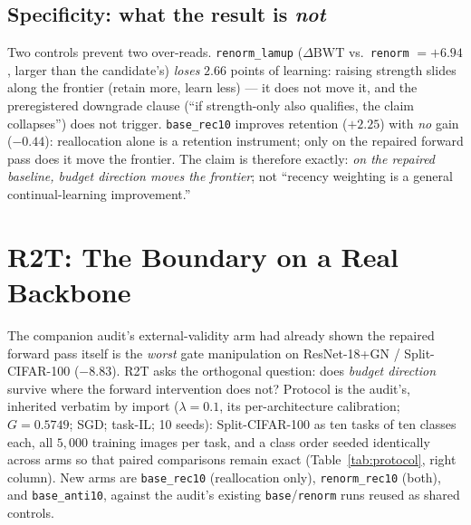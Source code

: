 \documentclass[10pt]{article}
\newcommand{\dbwt}{\Delta\mathrm{BWT}}
\begin{document}
\subsection{Specificity: what the result is \emph{not}}
Two controls prevent two over-reads. \texttt{renorm\_lamup}
($\dbwt$ vs.\ \texttt{renorm} $=+6.94$, larger than the candidate's)
\emph{loses} $2.66$ points of learning: raising strength slides along the
frontier (retain more, learn less) --- it does not move it, and the
preregistered downgrade clause (``if strength-only also qualifies, the claim
collapses'') does not trigger. \texttt{base\_rec10} improves retention
($+2.25$) with \emph{no} gain ($-0.44$): reallocation alone is a retention
instrument; only on the repaired forward pass does it move the frontier.
The claim is therefore exactly: \emph{on the repaired baseline, budget
direction moves the frontier}; not ``recency weighting is a general
continual-learning improvement.''

\section{R2T: The Boundary on a Real Backbone}
\label{sec:r2t}

The companion audit's external-validity arm had already shown the repaired
forward pass itself is the \emph{worst} gate manipulation on ResNet-18+GN /
Split-CIFAR-100 ($-8.83$). R2T asks the orthogonal question: does
\emph{budget direction} survive where the forward intervention does not?
Protocol is the audit's, inherited verbatim by import ($\lambda{=}0.1$, its
per-architecture calibration; $G{=}0.5749$; SGD; task-IL; 10 seeds):
Split-CIFAR-100 as ten tasks of ten classes each, all $5{,}000$ training
images per task, and a class order seeded identically across arms so that
paired comparisons remain exact
(Table~\ref{tab:protocol}, right column). New arms are
\texttt{base\_rec10} (reallocation only), \texttt{renorm\_rec10}
(both), and \texttt{base\_anti10}, against the audit's existing
\texttt{base}/\texttt{renorm} runs reused as shared controls.
\end{document}
